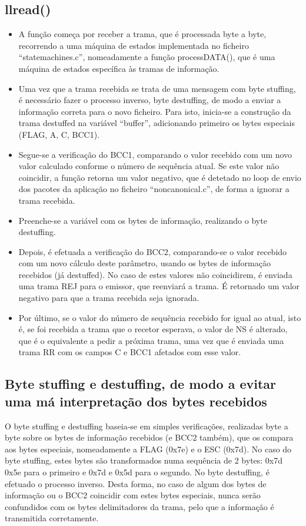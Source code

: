\documentclass[article, a4paper, 11pt, oneside]{memoir}
\begin{document}
\subsection{llread()}
\begin{itemize}
  	\item A função começa por receber a trama, que é processada byte a byte, recorrendo a uma máquina de estados implementada no ficheiro “statemachines.c”, nomeadamente a função processDATA(), que é uma máquina de estados específica às tramas de informação.
  	\item Uma vez que a trama recebida se trata de uma mensagem com byte stuffing, é necessário fazer o processo inverso, byte destuffing, de modo a enviar a informação correta para o novo ficheiro. Para isto, inicia-se a construção da trama destuffed na variável “buffer”, adicionando primeiro os bytes especiais (FLAG, A, C, BCC1).
  	\item Segue-se a verificação do BCC1, comparando o valor recebido com um novo valor calculado conforme o número de sequência atual. Se este valor não coincidir, a função retorna um valor negativo, que é detetado no loop de envio dos pacotes da aplicação no ficheiro “noncanonical.c”, de forma a ignorar a trama recebida.
  	\item Preenche-se a variável com os bytes de informação, realizando o byte destuffing.
  	\item Depois, é efetuada a verificação do BCC2, comparando-se o valor recebido com um novo cálculo deste parâmetro, usando os bytes de informação recebidos (já destuffed). No caso de estes valores não coincidirem, é enviada uma trama REJ para o emissor, que reenviará a trama. É retornado um valor negativo para que a trama recebida seja ignorada.
  	\item Por último, se o valor do número de sequência recebido for igual ao atual, isto é, se foi recebida a trama que o recetor esperava, o valor de NS é alterado, que é o equivalente a pedir a próxima trama, uma vez que é enviada uma trama RR com os campos C e BCC1 afetados com esse valor.

\end{itemize}

\subsection{Byte stuffing e destuffing, de modo a evitar uma má interpretação dos bytes recebidos}
O byte stuffing e destuffing baseia-se em simples verificações, realizadas byte a byte sobre os bytes de informação recebidos (e BCC2 também), 
que os compara aos bytes especiais, nomeadamente a FLAG (0x7e) e o ESC (0x7d). 
No caso do byte stuffing, estes bytes são transformados numa sequência de 2 bytes: 0x7d 0x5e para o primeiro e 0x7d e 0x5d para o segundo. 
No byte destuffing, é efetuado o processo inverso.
Desta forma, no caso de algum dos bytes de informação ou o BCC2 coincidir com estes bytes especiais, nunca serão confundidos com os bytes delimitadores da trama, 
pelo que a informação é transmitida corretamente.
\end{document}
